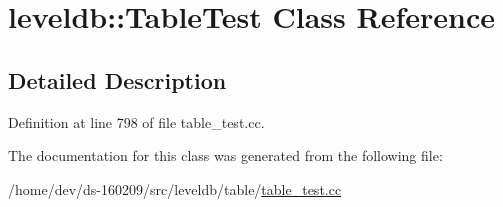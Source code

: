 \hypertarget{classleveldb_1_1_table_test}{}\section{leveldb\+:\+:Table\+Test Class Reference}
\label{classleveldb_1_1_table_test}


\subsection{Detailed Description}


Definition at line 798 of file table\+\_\+test.\+cc.



The documentation for this class was generated from the following file\+:\begin{DoxyCompactItemize}
\item 
/home/dev/ds-\/160209/src/leveldb/table/\hyperlink{table__test_8cc}{table\+\_\+test.\+cc}\end{DoxyCompactItemize}
